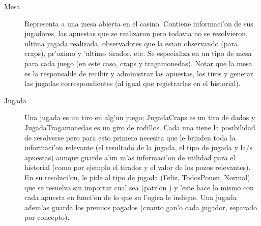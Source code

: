 \begin{description}
\item[Mesa] Representa a una mesa abierta en el casino. Contiene informaci'on de sus jugadores, las apuestas que se realizaron pero todavia no se resolvieron, ultima jugada realizada, observadores que la estan observando (para craps), pr'oximo y 'ultimo tirador, etc. Se especializa en un tipo de mesa para cada juego (en este caso, craps y tragamonedas). Notar que la mesa es la responsable de recibir y administrar las apuestas, los tiros y generar las jugadas correspondientes (al igual que registrarlas en el historial).

\item[Jugada] Una jugada es un tiro en alg'un juego; JugadaCraps es un tiro de dados y JugadaTragamonedas es un giro de rodillos. Cada una tiene la posibilidad de resolverse pero para esto primero necesita que le brinden toda la informaci'on relevante (el resultado de la jugada, el tipo de jugada y la/s apuestas) aunque guarde a'un m'as informaci'on de utilidad para el historial (como por ejemplo el tirador y el valor de los pozos relevantes). En su resoluci'on, le pide al tipo de jugada (Feliz, TodosPonen, Normal) que se resuelva sin importar cual sea (patr'on ) y 'este hace lo mismo con cada apuesta en funci'on de lo que su l'ogica le indique. Una jugada adem'as guarda los premios pagados (cuanto gan'o cada jugador, separado por concepto).


\end{description}

